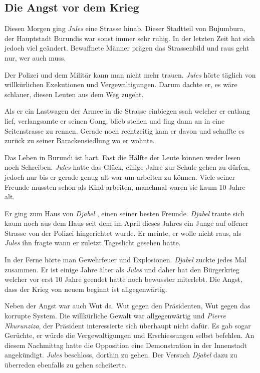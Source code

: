 \documentclass{article}
\def \nameone {\textit{Jules} }
\def \nametwo {\textit{Djabel} }
\begin{document}
	\subsection*{Die Angst vor dem Krieg}
		Diesen Morgen ging \nameone eine Strasse hinab. Dieser Stadtteil von Bujumbura, der Hauptstadt Burundis war sonst immer sehr ruhig. In der letzten Zeit hat sich jedoch viel geändert. Bewaffnete Männer prägen das Strassenbild und raus geht nur, wer auch muss.
		
		Der Polizei und dem Militär kann man nicht mehr trauen. \nameone hörte täglich  von willkürlichen Exekutionen und Vergewaltigungen. Darum dachte er, es wäre schlauer, diesen Leuten aus dem Weg zugeht.
		
		Als er ein Lastwagen der Armee in die Strasse einbiegen ssah welcher er entlang lief, verlangsamte er seinen Gang, blieb stehen und fing dann an in eine Seitenstrasse zu rennen. Gerade noch rechtzeitig kam er davon und schaffte es zurück zu seiner Barackensiedlung wo er wohnte. 
		
		Das Leben in Burundi ist hart. Fast die Hälfte der Leute können weder lesen noch Schreiben. \nameone hatte das Glück, einige Jahre zur Schule gehen zu dürfen, jedoch nur bis er gerade genug alt war um arbeiten zu können. Viele seiner Freunde mussten schon als Kind arbeiten, manchmal waren sie kaum 10 Jahre alt.
		
		Er ging zum Haus von \nametwo, einen seiner besten Freunde. \nametwo traute sich kaum noch aus dem Haus seit dem im April dieses Jahres ein Junge auf offener Strasse von der Polizei hingerichtet wurde. Er meinte, er wolle nicht raus, als \nameone ihn fragte wann er zuletzt Tageslicht gesehen hatte.
		
		In der Ferne hörte man Gewehrfeuer und Explosionen. \nametwo zuckte jedes Mal zusammen. Er ist einige Jahre älter als \nameone und daher hat den Bürgerkrieg welcher vor erst 10 Jahre geendet hatte noch bewusster miterlebt. Die Angst, dass der Krieg von neuem beginnt ist allgegenwärtig. 
	
		Neben der Angst war auch Wut da. Wut gegen den Präsidenten, Wut gegen das korrupte System. Die willkürliche Gewalt war allgegenwärtig und \textit{Pierre Nkurunziza}, der Präsident interessierte sich überhaupt nicht dafür. Es gab sogar Gerüchte, er würde die Vergewaltigungen und Erschiessungen selbst befehlen. An diesem Nachmittag hatte die Opposition eine Demonstration in der Innenstadt angekündigt. \nameone beschloss, dorthin zu gehen. Der Versuch \nametwo dazu zu überreden ebenfalls zu gehen scheiterte.
		
\end{document}
